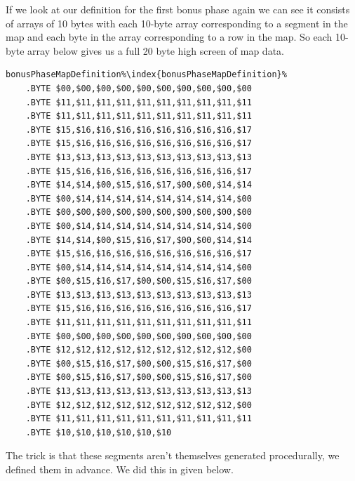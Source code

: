 If we look at our definition for the first bonus phase  again we can see it consists of arrays of 10 bytes with
each 10-byte array corresponding to a segment in the map and each byte in the array corresponding to a row in the map. 
So each 10-byte array below gives us a full 20 byte high screen of map data.

\begin{lstlisting}[escapechar=\%]
bonusPhaseMapDefinition%\index{bonusPhaseMapDefinition}% 
    .BYTE $00,$00,$00,$00,$00,$00,$00,$00,$00,$00
    .BYTE $11,$11,$11,$11,$11,$11,$11,$11,$11,$11
    .BYTE $11,$11,$11,$11,$11,$11,$11,$11,$11,$11
    .BYTE $15,$16,$16,$16,$16,$16,$16,$16,$16,$17
    .BYTE $15,$16,$16,$16,$16,$16,$16,$16,$16,$17
    .BYTE $13,$13,$13,$13,$13,$13,$13,$13,$13,$13
    .BYTE $15,$16,$16,$16,$16,$16,$16,$16,$16,$17
    .BYTE $14,$14,$00,$15,$16,$17,$00,$00,$14,$14
    .BYTE $00,$14,$14,$14,$14,$14,$14,$14,$14,$00
    .BYTE $00,$00,$00,$00,$00,$00,$00,$00,$00,$00
    .BYTE $00,$14,$14,$14,$14,$14,$14,$14,$14,$00
    .BYTE $14,$14,$00,$15,$16,$17,$00,$00,$14,$14
    .BYTE $15,$16,$16,$16,$16,$16,$16,$16,$16,$17
    .BYTE $00,$14,$14,$14,$14,$14,$14,$14,$14,$00
    .BYTE $00,$15,$16,$17,$00,$00,$15,$16,$17,$00
    .BYTE $13,$13,$13,$13,$13,$13,$13,$13,$13,$13
    .BYTE $15,$16,$16,$16,$16,$16,$16,$16,$16,$17
    .BYTE $11,$11,$11,$11,$11,$11,$11,$11,$11,$11
    .BYTE $00,$00,$00,$00,$00,$00,$00,$00,$00,$00
    .BYTE $12,$12,$12,$12,$12,$12,$12,$12,$12,$00
    .BYTE $00,$15,$16,$17,$00,$00,$15,$16,$17,$00
    .BYTE $00,$15,$16,$17,$00,$00,$15,$16,$17,$00
    .BYTE $13,$13,$13,$13,$13,$13,$13,$13,$13,$13
    .BYTE $12,$12,$12,$12,$12,$12,$12,$12,$12,$00
    .BYTE $11,$11,$11,$11,$11,$11,$11,$11,$11,$11
    .BYTE $10,$10,$10,$10,$10,$10
\end{lstlisting}

The trick is that these segments aren't themselves
generated procedurally, we defined them in advance.  We did this in 
given below.

